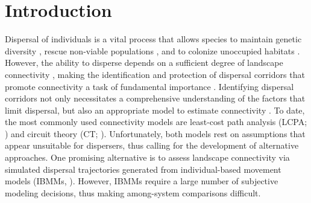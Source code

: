 \documentclass[abstract=on,10pt,a4paper,bibliography=totocnumbered]{article}
\begin{document}
\newpage

\doublespacing

\newpage
{}

\linenumbers

\section{Introduction}

Dispersal of individuals is a vital process that allows species to maintain
genetic diversity \citep{Perrin.2000, Frankham.2002, Leigh.2012, Baguette.2013},
rescue non-viable populations \citep{Brown.1977}, and to colonize unoccupied
habitats \citep{Hanski.1999b, MacArthur.2001}. However, the ability to disperse
depends on a sufficient degree of landscape connectivity \citep{Fahrig.2003,
Clobert.2012}, making the identification and protection of dispersal corridors
that promote connectivity a task of fundamental importance \citep{Doerr.2011,
Rudnick.2012}. Identifying dispersal corridors not only necessitates a
comprehensive understanding of the factors that limit dispersal, but also an
appropriate model to estimate connectivity \citep{Baguette.2013, Vasudev.2015,
Hofmann.2021}. To date, the most commonly used connectivity models are
least-cost path analysis (LCPA; \citealp{Adriaensen.2003}) and circuit theory
(CT; \citealp{McRae.2006, McRae.2008}). Unfortunately, both models rest on
assumptions that appear unsuitable for dispersers, thus calling for the
development of alternative approaches. One promising alternative is to assess
landscape connectivity via simulated dispersal trajectories generated from
individual-based movement models (IBMMs, \citealp{Diniz.2019}). However, IBMMs
require a large number of subjective modeling decisions, thus making
among-system comparisons difficult.
\end{document}
